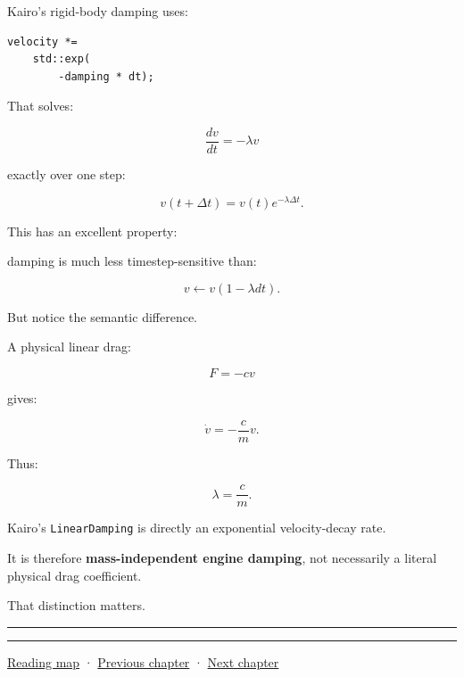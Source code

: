 Kairo's rigid-body damping uses:

\begin{verbatim}
velocity *=
    std::exp(
        -damping * dt);
\end{verbatim}

That solves:

\[
\frac{dv}{dt}
=
-\lambda v
\]

exactly over one step:

\[
\boxed{
v(t+\Delta t)
=
v(t)e^{-\lambda\Delta t}.
}
\]

This has an excellent property:

damping is much less timestep-sensitive than:

\[
v\leftarrow v(1-\lambda dt).
\]

But notice the semantic difference.

A physical linear drag:

\[
F=-cv
\]

gives:

\[
\dot v
=
-\frac{c}{m}v.
\]

Thus:

\[
\lambda
=
\frac{c}{m}.
\]

Kairo's \texttt{LinearDamping} is directly an exponential velocity-decay rate.

It is therefore \textbf{mass-independent engine damping}, not necessarily a literal physical drag coefficient.

That distinction matters.

\begin{center}\rule{0.5\linewidth}{0.5pt}\end{center}

\begin{center}\rule{0.5\linewidth}{0.5pt}\end{center}

\href{Chapter\%20Edition/03\%20-\%20Game\%20Engine/00\%20-\%20Reading\%20Map}{Reading map} · \hyperref[06-engine-ii-ch033]{Previous chapter} · \hyperref[06-engine-ii-ch035]{Next chapter}

